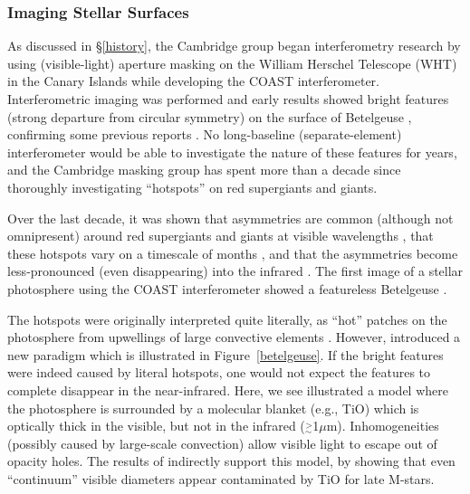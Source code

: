 \documentclass[12pt]{iopart}
\newcommand{\simge}{\mbox{$\stackrel{>}{_{\sim}}$}}
\begin{document}
\subsubsection{Imaging Stellar Surfaces}
\label{hotspots}
As discussed in \S\ref{history}, the Cambridge group began
interferometry research by using (visible-light) aperture masking on
the William Herschel Telescope (WHT) in the Canary Islands
\citep{baldwin1986,haniff1987} while developing the COAST
interferometer.  Interferometric imaging was performed and early
results showed bright features (strong departure from circular
symmetry) on the surface of Betelgeuse \citep{buscher1990}, confirming
some previous reports \citep[e.g.,][]{roddier1983}.  No long-baseline
(separate-element) interferometer would be able to investigate the
nature of these features for years, and the Cambridge masking group
has spent more than a decade since thoroughly investigating
``hotspots'' on red supergiants and giants.

Over the last decade, it was shown that asymmetries are common
(although not omnipresent) around red supergiants and giants at visible
wavelengths \citep{wilson1992,tuthill1997,tuthill1999a}, that these
hotspots vary on a timescale of months \citep{wilson1997}, and that the
asymmetries become less-pronounced (even disappearing) into the
infrared \citep{young2000b}.  The first image of a stellar photosphere
using the COAST interferometer showed a featureless Betelgeuse
\citep{burns1997}.

The hotspots were originally interpreted quite literally, as ``hot''
patches on the photosphere from upwellings of large convective
elements \citep{schwarzschild1975}.  However, \citet{young2000b}
introduced a new paradigm which is illustrated in
Figure~\ref{betelgeuse}. If the bright features were indeed caused by
literal hotspots, one would not expect the features to complete
disappear in the near-infrared.  Here, we see illustrated a model where
the photosphere is surrounded by a molecular blanket (e.g., TiO) which
is optically thick in the visible, but not in the infrared
($\simge$1$\mu$m).  Inhomogeneities (possibly caused by large-scale
convection) allow visible light to escape out of opacity holes.  The
results of \cite{dyck2002} indirectly support this model, by showing
that even ``continuum'' visible diameters appear contaminated by TiO
for late M-stars.
\end{document}
